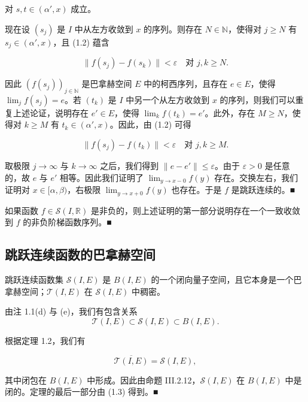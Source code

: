 \begin{theorem}
对 $ s, t \in (\alpha', x) $ 成立。

现在设 $ (s_j) $ 是 $ I $ 中从左方收敛到 $ x $ 的序列。则存在 $ N \in \mathbb{N} $，使得对 $ j \ge N $ 有 $ s_j \in (\alpha', x) $，且 (1.2) 蕴含

\[
\|f(s_j) - f(s_k)\| < \varepsilon \quad \text{对 } j, k \ge N.
\]

因此 $ (f(s_j))_{j \in \mathbb{N}} $ 是巴拿赫空间 $ E $ 中的柯西序列，且存在 $ e \in E $，使得 $ \lim_j f(s_j) = e $。若 $ (t_k) $ 是 $ I $ 中另一个从左方收敛到 $ x $ 的序列，则我们可以重复上述论证，说明存在 $ e' \in E $，使得 $ \lim_k f(t_k) = e' $。此外，存在 $ M \ge N $，使得对 $ k \ge M $ 有 $ t_k \in (\alpha', x) $。因此，由 (1.2) 可得

\[
\|f(s_j) - f(t_k)\| < \varepsilon \quad \text{对 } j, k \ge M.
\]

取极限 $ j \to \infty $ 与 $ k \to \infty $ 之后，我们得到 $ \|e - e'\| \le \varepsilon $。由于 $ \varepsilon > 0 $ 是任意的，故 $ e $ 与 $ e' $ 相等。因此我们证明了 $ \lim_{y \to x-0} f(y) $ 存在。交换左右，我们证明对 $ x \in [\alpha, \beta) $，右极限 $ \lim_{y \to x+0} f(y) $ 也存在。于是 $ f $ 是跳跃连续的。\nobreak\hspace{0.35em}■

\end{theorem}

\begin{remark}

如果函数 $ f \in \mathcal{S}(I, \mathbb{R}) $ 是非负的，则上述证明的第一部分说明存在一个一致收敛到 $ f $ 的非负阶梯函数序列。\nobreak\hspace{0.35em}■

\end{remark}

\subsection*{跳跃连续函数的巴拿赫空间}

\begin{theorem}

跳跃连续函数集 $ \mathcal{S}(I, E) $ 是 $ B(I, E) $ 的一个闭向量子空间，且它本身是一个巴拿赫空间；$ \mathcal{T}(I, E) $ 在 $ \mathcal{S}(I, E) $ 中稠密。

\proofhead
由注 1.1(d) 与 (e)，我们有包含关系
\[
\mathcal{T}(I, E) \subset \mathcal{S}(I, E) \subset B(I, E).
\]

根据定理 1.2，我们有

\begin{equation}
\overline{\mathcal{T}(I, E)} = \mathcal{S}(I, E),\tag{1.3}
\end{equation}

其中闭包在 $ B(I, E) $ 中形成。因此由命题 III.2.12，$ \mathcal{S}(I, E) $ 在 $ B(I, E) $ 中是闭的。定理的最后一部分由 (1.3) 得到。\nobreak\hspace{0.35em}■

\end{theorem}

